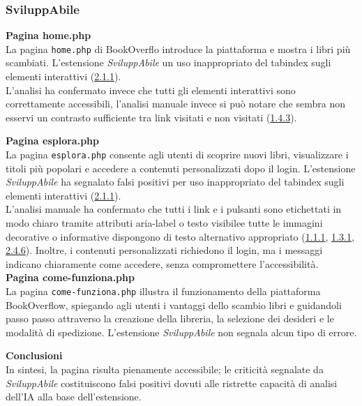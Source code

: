 \subsubsection{SviluppAbile}
\noindent \textbf{Pagina home.php}\\
La pagina \texttt{home.php} di BookOverflo introduce la piattaforma e mostra i libri più scambiati. 
L’estensione \textit{SviluppAbile} un uso inappropriato del tabindex sugli elementi interattivi ({\hyperref[wcag:2.1.1]{2.1.1}}).\\
L’analisi ha confermato invece che tutti gli elementi interattivi sono correttamente accessibili, l'analisi manuale invece si può notare che sembra non esservi un contrasto sufficiente tra link visitati e non visitati ({\hyperref[wcag:1.4.3]{1.4.3}}).

\noindent \textbf{Pagina esplora.php}\\
La pagina \texttt{esplora.php} consente agli utenti di scoprire nuovi libri, visualizzare i titoli più popolari e accedere a contenuti personalizzati dopo il login. 
L’estensione \textit{SviluppAbile} ha segnalato falsi positivi per uso inappropriato del tabindex sugli elementi interattivi ({\hyperref[wcag:2.1.1]{2.1.1}}).\\
L’analisi manuale ha confermato che tutti i link e i pulsanti sono etichettati in modo chiaro tramite attributi aria-label o testo visibilee tutte le immagini decorative o informative dispongono di testo alternativo appropriato ({\hyperref[wcag:1.1.1]{1.1.1}}, {\hyperref[wcag:1.3.1]{1.3.1}}, {\hyperref[wcag:2.4.6]{2.4.6}}). Inoltre, i contenuti personalizzati richiedono il login, ma i messaggi indicano chiaramente come accedere, senza compromettere l’accessibilità.\\

\noindent \textbf{Pagina come-funziona.php}\\
La pagina \texttt{come-funziona.php} illustra il funzionamento della piattaforma BookOverflow, spiegando agli utenti i vantaggi dello scambio libri e guidandoli passo passo attraverso la creazione della libreria, la selezione dei desideri e le modalità di spedizione. 
L’estensione \textit{SviluppAbile} non segnala alcun tipo di errore.

\noindent \textbf{Conclusioni}\\
In sintesi, la pagina risulta pienamente accessibile; le criticità segnalate da \textit{SviluppAbile} costituiscono falsi positivi dovuti alle ristrette capacità di analisi dell'IA alla base dell'estensione.\\


